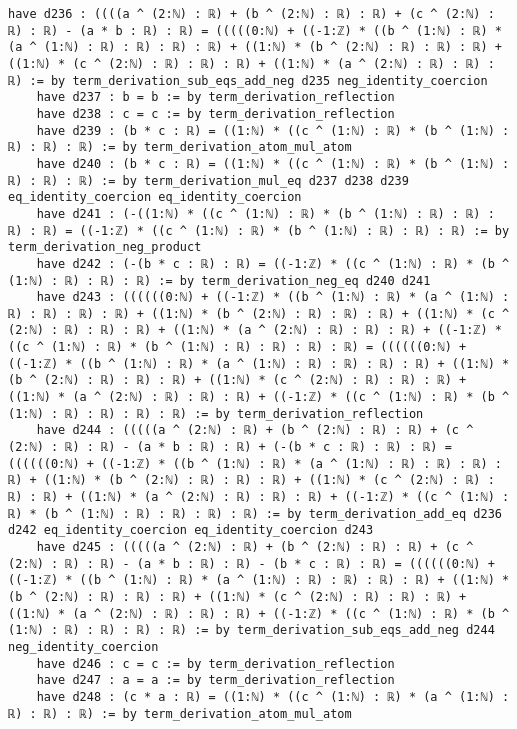 \documentclass{article}
\begin{document}
\begin{tcolorbox}[colback=white!10, width=\linewidth]
\begin{lstlisting}[language=Lean4]
    have d236 : ((((a ^ (2:ℕ) : ℝ) + (b ^ (2:ℕ) : ℝ) : ℝ) + (c ^ (2:ℕ) : ℝ) : ℝ) - (a * b : ℝ) : ℝ) = (((((0:ℕ) + ((-1:ℤ) * ((b ^ (1:ℕ) : ℝ) * (a ^ (1:ℕ) : ℝ) : ℝ) : ℝ) : ℝ) + ((1:ℕ) * (b ^ (2:ℕ) : ℝ) : ℝ) : ℝ) + ((1:ℕ) * (c ^ (2:ℕ) : ℝ) : ℝ) : ℝ) + ((1:ℕ) * (a ^ (2:ℕ) : ℝ) : ℝ) : ℝ) := by term_derivation_sub_eqs_add_neg d235 neg_identity_coercion
    have d237 : b = b := by term_derivation_reflection
    have d238 : c = c := by term_derivation_reflection
    have d239 : (b * c : ℝ) = ((1:ℕ) * ((c ^ (1:ℕ) : ℝ) * (b ^ (1:ℕ) : ℝ) : ℝ) : ℝ) := by term_derivation_atom_mul_atom
    have d240 : (b * c : ℝ) = ((1:ℕ) * ((c ^ (1:ℕ) : ℝ) * (b ^ (1:ℕ) : ℝ) : ℝ) : ℝ) := by term_derivation_mul_eq d237 d238 d239 eq_identity_coercion eq_identity_coercion
    have d241 : (-((1:ℕ) * ((c ^ (1:ℕ) : ℝ) * (b ^ (1:ℕ) : ℝ) : ℝ) : ℝ) : ℝ) = ((-1:ℤ) * ((c ^ (1:ℕ) : ℝ) * (b ^ (1:ℕ) : ℝ) : ℝ) : ℝ) := by term_derivation_neg_product
    have d242 : (-(b * c : ℝ) : ℝ) = ((-1:ℤ) * ((c ^ (1:ℕ) : ℝ) * (b ^ (1:ℕ) : ℝ) : ℝ) : ℝ) := by term_derivation_neg_eq d240 d241
    have d243 : ((((((0:ℕ) + ((-1:ℤ) * ((b ^ (1:ℕ) : ℝ) * (a ^ (1:ℕ) : ℝ) : ℝ) : ℝ) : ℝ) + ((1:ℕ) * (b ^ (2:ℕ) : ℝ) : ℝ) : ℝ) + ((1:ℕ) * (c ^ (2:ℕ) : ℝ) : ℝ) : ℝ) + ((1:ℕ) * (a ^ (2:ℕ) : ℝ) : ℝ) : ℝ) + ((-1:ℤ) * ((c ^ (1:ℕ) : ℝ) * (b ^ (1:ℕ) : ℝ) : ℝ) : ℝ) : ℝ) = ((((((0:ℕ) + ((-1:ℤ) * ((b ^ (1:ℕ) : ℝ) * (a ^ (1:ℕ) : ℝ) : ℝ) : ℝ) : ℝ) + ((1:ℕ) * (b ^ (2:ℕ) : ℝ) : ℝ) : ℝ) + ((1:ℕ) * (c ^ (2:ℕ) : ℝ) : ℝ) : ℝ) + ((1:ℕ) * (a ^ (2:ℕ) : ℝ) : ℝ) : ℝ) + ((-1:ℤ) * ((c ^ (1:ℕ) : ℝ) * (b ^ (1:ℕ) : ℝ) : ℝ) : ℝ) : ℝ) := by term_derivation_reflection
    have d244 : (((((a ^ (2:ℕ) : ℝ) + (b ^ (2:ℕ) : ℝ) : ℝ) + (c ^ (2:ℕ) : ℝ) : ℝ) - (a * b : ℝ) : ℝ) + (-(b * c : ℝ) : ℝ) : ℝ) = ((((((0:ℕ) + ((-1:ℤ) * ((b ^ (1:ℕ) : ℝ) * (a ^ (1:ℕ) : ℝ) : ℝ) : ℝ) : ℝ) + ((1:ℕ) * (b ^ (2:ℕ) : ℝ) : ℝ) : ℝ) + ((1:ℕ) * (c ^ (2:ℕ) : ℝ) : ℝ) : ℝ) + ((1:ℕ) * (a ^ (2:ℕ) : ℝ) : ℝ) : ℝ) + ((-1:ℤ) * ((c ^ (1:ℕ) : ℝ) * (b ^ (1:ℕ) : ℝ) : ℝ) : ℝ) : ℝ) := by term_derivation_add_eq d236 d242 eq_identity_coercion eq_identity_coercion d243
    have d245 : (((((a ^ (2:ℕ) : ℝ) + (b ^ (2:ℕ) : ℝ) : ℝ) + (c ^ (2:ℕ) : ℝ) : ℝ) - (a * b : ℝ) : ℝ) - (b * c : ℝ) : ℝ) = ((((((0:ℕ) + ((-1:ℤ) * ((b ^ (1:ℕ) : ℝ) * (a ^ (1:ℕ) : ℝ) : ℝ) : ℝ) : ℝ) + ((1:ℕ) * (b ^ (2:ℕ) : ℝ) : ℝ) : ℝ) + ((1:ℕ) * (c ^ (2:ℕ) : ℝ) : ℝ) : ℝ) + ((1:ℕ) * (a ^ (2:ℕ) : ℝ) : ℝ) : ℝ) + ((-1:ℤ) * ((c ^ (1:ℕ) : ℝ) * (b ^ (1:ℕ) : ℝ) : ℝ) : ℝ) : ℝ) := by term_derivation_sub_eqs_add_neg d244 neg_identity_coercion
    have d246 : c = c := by term_derivation_reflection
    have d247 : a = a := by term_derivation_reflection
    have d248 : (c * a : ℝ) = ((1:ℕ) * ((c ^ (1:ℕ) : ℝ) * (a ^ (1:ℕ) : ℝ) : ℝ) : ℝ) := by term_derivation_atom_mul_atom

\end{lstlisting}
\end{tcolorbox}
\end{document}
